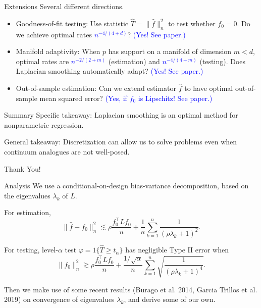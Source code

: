 \documentclass[xcolor=dvipsnames]{beamer}
\newcommand{\wh}[1]{\widehat{#1}}
\newcommand{\blue}[1]{\textcolor{blue}{#1}}
\begin{document}
\begin{frame}{Extensions}
Several different directions.
\begin{itemize}
	\item \alert{Goodness-of-fit testing}: Use statistic $\wh{T} = \|\wh{f}\|_n^2$ to test whether $f_0 = 0$. Do we achieve optimal rates \blue{$n^{-4/(4 + d)}$}? \blue{(Yes! See paper.)}
	\item \alert{Manifold adaptivity}: When $p$ has support on a manifold of dimension $m < d$, optimal rates are \blue{$n^{-2/(2 + m)}$} (estimation) and \blue{$n^{-4/(4 + m)}$} (testing). Does Laplacian smoothing automatically adapt? \blue{(Yes! See paper.)} 
	\item \alert{Out-of-sample estimation}: Can we extend estimator $\wh{f}$ to have optimal out-of-sample mean squared error? \blue{(Yes, if $f_0$ is Lipschitz! See paper.)}
\end{itemize}
\end{frame}

\begin{frame}[t]{Summary}
	Specific takeaway: Laplacian smoothing is an optimal method for nonparametric regression. \newline
	
	General takeaway: Discretization can allow us to solve problems even when continuum analogues are not well-posed.
	\newline 
	\newline
	\newline
	\pause
	\begin{center}
	{\huge Thank You!}
	\end{center}
	
	
\end{frame}

\begin{frame}{Analysis}
We use a conditional-on-design \alert{bias-variance} decomposition, based on the eigenvalues $\lambda_k$ of $L$. \newline

For estimation,
\begin{equation*}
\|\wh{f} - f_0\|_n^2 \lesssim \rho \frac{f_0^{\top} L f_0}{n} + \frac{1}{n} \sum_{k = 1}^{n} \frac{1}{(\rho \lambda_k + 1)^2}.
\end{equation*}

For testing, level-$\alpha$ test $\varphi = 1\{\wh{T} \geq t_{\alpha}\}$ has negligible Type II error when
\begin{equation*}
\|f_0\|_n^2 \gtrsim \rho \frac{f_0^{\top} L f_0}{n} + \frac{1/\sqrt{\alpha}}{n} \sum_{k = 1}^{n} \sqrt{\frac{1}{(\rho \lambda_k + 1)^4}}.
\end{equation*}

Then we make use of some recent results (Burago et al. 2014, Garcia Trillos et al. 2019) on convergence of eigenvalues $\lambda_k$, and derive some of our own.
\end{frame}
\end{document}
